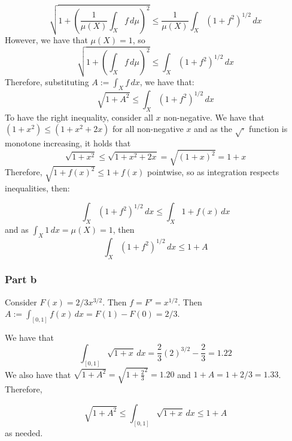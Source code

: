 \documentclass{article}
\theoremstyle{definition}
\numberwithin{theorem}{section}
\numberwithin{equation}{section}
\begin{document}
\begin{equation}
	\sqrt{1 + \left(\frac{1}{\mu(X)} \int_X f \, d\mu\right)^2} \leq \frac{1}{\mu(X)} \int_X \left(1 + f^2\right)^{1/2} \, dx
\end{equation}
However, we have that $\mu(X) = 1$, so 
\begin{equation}
	\sqrt{1 + \left( \int_X f \, d\mu\right)^2} \leq \int_X \left(1 + f^2\right)^{1/2} \, dx
\end{equation}
Therefore, substituting $A := \int_X f \, dx$, we have that:
\begin{equation}
	\sqrt{1 + A^2} \leq \int_X \left(1 + f^2\right)^{1/2} \, dx
\end{equation}
To have the right inequality, consider all $x$ non-negative. We have that $(1 + x^2) \leq (1 + x^2 + 2x)$ for all non-negative $x$ and as the $\sqrt{ \cdot }$ function is monotone increasing, it holds that
\begin{equation}
	\sqrt{1 + x^2} \leq \sqrt{1 + x^2 + 2x} = \sqrt{(1 + x)^2} = 1 + x
\end{equation}
Therefore, $\sqrt{1 + f(x)^2} \leq 1 + f(x)$ pointwise, so as integration respects inequalities, then:

\begin{equation}
\int_X \left(1 + f^2\right)^{1/2} \, dx \leq \int_X 1 + f(x) \, dx
\end{equation}
and as $\int_X 1 \, dx = \mu(X) = 1$, then 
\begin{equation}
	\int_X \left(1 + f^2\right)^{1/2} \, dx \leq 1 + A
\end{equation}
\subsubsection*{Part b}
Consider $F(x) = 2/3 x^{3/2}$. Then $f = F' = x^{1/2}$. Then $A := \int_{[0,1]} f(x) \, dx =  F(1) - F(0) = 2/3$. 

We have that
\begin{equation}
	\int_{[0,1]} \sqrt{1 + x} \, dx = \frac{2}{3} (2)^{3/2} - \frac{2}{3} = 1.22
\end{equation}
We also have that $\sqrt{1 + A^2} = \sqrt{1 + \frac{2}{3}^2} = 1.20$ and $1 + A = 1 + 2/3 = 1.33$. Therefore, 

\begin{equation}
	\sqrt{1 + A^2} \leq \int_{[0,1]} \sqrt{1 + x} \, dx \leq 1 + A
\end{equation}
as needed.
\end{document}
